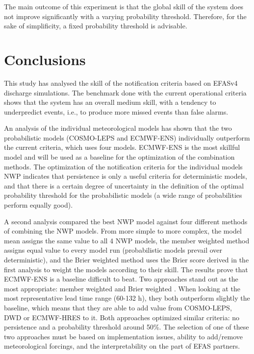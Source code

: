 \documentclass[preprint,12pt]{elsarticle}
\begin{document}
The main outcome of this experiment is that the global skill of the system does not improve significantly with a varying probability threshold. Therefore, for the sake of simplificity, a fixed probability threshold is advisable.

\section{Conclusions}
This study has analysed the skill of the notification criteria based on EFASv4 discharge simulations. The benchmark done with the current operational criteria shows that the system has an overall medium skill, with a tendency to underpredict events, i.e., to produce more missed events than false alarms.

An analysis of the individual meteorological models has shown that the two probabilistic models (COSMO-LEPS and ECMWF-ENS) individually outperform the current criteria, which uses four models. ECMWF-ENS is the most skillful model and will be used as a baseline for the optimization of the combination methods. The optimization of the notification criteria for the individual models NWP indicates that persistence is only a useful criteria for deterministic models, and that there is a certain degree of uncertainty in the definition of the optimal probability threshold for the probabilistic models (a wide range of probabilities perform equally good).

A second analysis compared the best NWP model against four different methods of combining the NWP models. From more simple to more complex, the model mean assigns the same value to all 4 NWP models, the member weighted method assigns equal value to every model run (probabilistic models prevail over deterministic), and the Brier weighted method uses the Brier score derived in the first analysis to weight the models according to their skill. The results prove that ECMWF-ENS is a baseline difficult to beat. Two approaches stand out as the most appropriate: member weighted  and Brier weighted . When looking at the most representative lead time range (60-132 h), they both outperform slightly the baseline, which means that they are able to add value from COSMO-LEPS, DWD or ECMWF-HRES to it. Both approaches optimized similar criteria: no persistence and a probability threshold around 50\%. The selection of one of these two approaches must be based on implementation issues, ability to add/remove meteorological forcings, and the interpretability on the part of EFAS partners.
\end{document}
